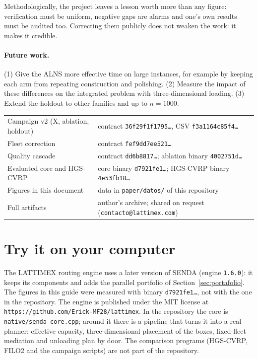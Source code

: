 \documentclass[11pt,a4paper]{article}
\newcommand{\tsl}[1]{\texttt{\small #1}}
\begin{document}
Methodologically, the project leaves a lesson worth more than any figure: verification must be
uniform, negative gaps are alarms and one's own results must be audited too. Correcting them publicly
does not weaken the work: it makes it credible.

\paragraph{Future work.}
(1) Give the ALNS more effective time on large instances, for example by keeping each arm from
repeating construction and polishing.
(2) Measure the impact of these differences on the integrated problem with three-dimensional loading.
(3) Extend the holdout to other families and up to $n=1000$.

\begin{reproducir}[: artifacts]
\small
\begin{tabular}{@{}p{4.9cm}p{9.6cm}@{}}
Campaign v2 (X, ablation, holdout) & contract \tsl{36f29f1f1795\ldots}, CSV \tsl{f3a1164c85f4\ldots} \\
Fleet correction & contract \tsl{fef9dd7ee521\ldots} \\
Quality cascade & contract \tsl{dd6b8817\ldots}; ablation binary \tsl{4002751d\ldots} \\
Evaluated core and HGS-CVRP & core binary \tsl{d7921fe1\ldots}; HGS-CVRP binary \tsl{4e53fb18\ldots} \\
Figures in this document & data in \tsl{paper/datos/} of this repository \\
Full artifacts & author's archive; shared on request (\tsl{contacto@lattimex.com}) \\
\end{tabular}
\end{reproducir}


\section{Try it on your computer}
\label{sec:pruebalo}

The LATTIMEX routing engine uses a later version of SENDA (engine \tsl{1.6.0}): it keeps its
components and adds the parallel portfolio of Section~\ref{sec:portafolio}. The figures in this guide
were measured with binary \tsl{d7921fe1\ldots}, not with the one in the repository. The engine is
published under the MIT license at \texttt{https://github.com/Erick-MF28/lattimex}. In the repository
the core is \tsl{native/senda\_core.cpp}; around it there is a pipeline that turns it into a real
planner: effective capacity, three-dimensional placement of the boxes, fixed-fleet mediation and
unloading plan by door. The comparison programs (HGS-CVRP, FILO2 and the campaign scripts) are not
part of the repository.
\end{document}
